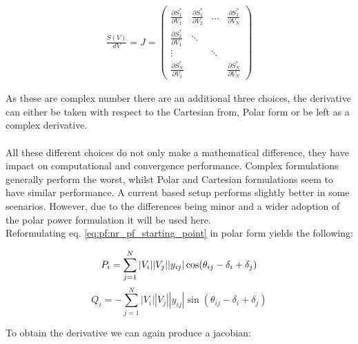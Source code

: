 \begin{align}
    \frac{S(V)}{dV} = J = 
    \begin{pmatrix}
        \frac{\partial S^*_1}{\partial V_1} & \frac{\partial S^*_1}{\partial V_2} & \dots  & \frac{\partial S^*_1}{\partial V_N}\\
        \frac{\partial S^*_2}{\partial V_1} & \ddots                              &        &                                    \\
        \vdots                              &                                     & \ddots &                                    \\
        \frac{\partial S^*_N}{\partial V_1} &                                     &        & \frac{\partial S^*_N}{\partial V_N}
    \end{pmatrix}
\end{align}

As these are complex number there are an additional three choices, the derivative can either be taken
with respect to the Cartesian from, Polar form or be left as a complex derivative.\\
\\
All these different choices do not only make a mathematical difference, they have impact
on computational and convergence performance\autocite{newton_raphson_setup_choices}. Complex formulations
generally perform the worst, whilst Polar and Cartesian formulations seem to have similar performance.
A current based setup performs slightly better in some scenarios\autocite{newton_raphson_setup_choices}.
However, due to the differences being minor and a wider adoption of the polar power formulation it will be used
here.\\

Reformulating eq. \ref{eq:pf:nr_pf_starting_point} in polar form yields the following:

\begin{equation}
    P_i = \sum_{j=1}^N |V_i||V_j||y_{ij}| \cos(\theta_{ij} - \delta_i + \delta_j)\\
    \label{eq:pf:nr_pf_p}
\end{equation}
\begin{equation}
    Q_i = -\sum_{j=1}^N |V_i||V_j||y_{ij}| \sin(\theta_{ij} - \delta_i + \delta_j)
    \label{eq:pf:nr_pf_q}
\end{equation}

To obtain the derivative we can again produce a jacobian:

